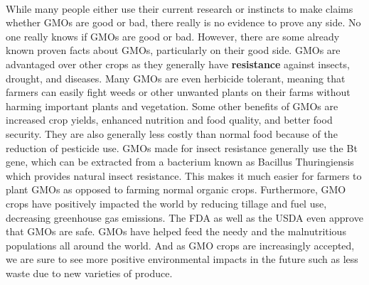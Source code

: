 \documentclass[11pt]{article}
\begin{document}
    \paragraph{}
    While many people either use their current research or instincts to make claims whether GMOs are good or bad,
    there really is no evidence to prove any side.
    No one really knows if GMOs are good or bad.
    However, there are some already known proven facts about GMOs, particularly on their good side.
    GMOs are advantaged over other crops as they generally have \textbf{resistance} against insects, drought, and diseases.
    Many GMOs are even herbicide tolerant, meaning that farmers can easily fight weeds or other unwanted plants on their farms without harming important plants and vegetation.
    Some other benefits of GMOs are increased crop yields, enhanced nutrition and food quality, and better food security.
    They are also generally less costly than normal food because of the reduction of pesticide use.
    GMOs made for insect resistance
    generally use the Bt gene, which can be extracted from a bacterium known as Bacillus Thuringiensis which provides natural insect
    resistance.
    This makes it much easier for farmers to plant GMOs as opposed to farming normal organic crops.
    Furthermore, GMO crops have positively impacted the world by reducing tillage and fuel use, decreasing greenhouse gas emissions.
    The FDA as well as the USDA even approve that GMOs are safe.
    GMOs have helped feed the needy and the malnutritious populations all around the world.
    And as GMO crops are increasingly accepted, we are sure to see more positive environmental impacts in the future such as less waste due to new varieties of produce.
\end{document}

